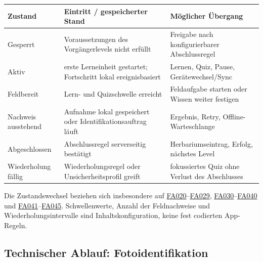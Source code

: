 \documentclass[10pt,a4paper,oneside]{article}
\newcommand{\R}[1]{\hyperlink{req:#1}{\textcolor{Forest}{#1}}}
\begin{document}
\begin{tabularx}{\textwidth}{@{}p{31mm}X X@{}}
\toprule
\textbf{Zustand} & \textbf{Eintritt / gespeicherter Stand} & \textbf{Möglicher Übergang} \\
\midrule
Gesperrt & Voraussetzungen des Vorgängerlevels nicht erfüllt & Freigabe nach konfigurierbarer Abschlussregel \\
Aktiv & erste Lerneinheit gestartet; Fortschritt lokal ereignisbasiert & Lernen, Quiz, Pause, Gerätewechsel/Sync \\
Feldbereit & Lern- und Quizschwelle erreicht & Feldaufgabe starten oder Wissen weiter festigen \\
Nachweis ausstehend & Aufnahme lokal gespeichert oder Identifikationsauftrag läuft & Ergebnis, Retry, Offline-Warteschlange \\
Abgeschlossen & Abschlussregel serverseitig bestätigt & Herbariumseintrag, Erfolg, nächstes Level \\
Wiederholung fällig & Wiederholungsregel oder Unsicherheitsprofil greift & fokussiertes Quiz ohne Verlust des Abschlusses \\
\bottomrule
\end{tabularx}

Die Zustandswechsel beziehen sich insbesondere auf \R{FA020}--\R{FA029}, \R{FA030}--\R{FA040} und \R{FA041}--\R{FA045}. Schwellenwerte, Anzahl der Feldnachweise und Wiederholungsintervalle sind Inhaltskonfiguration, keine fest codierten App-Regeln.

\subsection{Technischer Ablauf: Fotoidentifikation}
\end{document}
